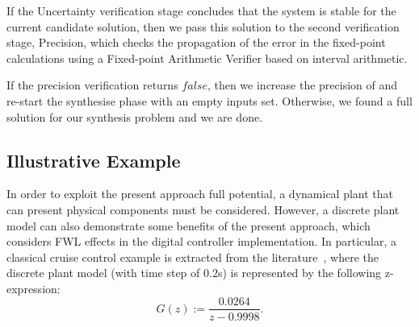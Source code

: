 \documentclass{sig-alternate-05-2015}
\begin{document}
If the {\sc Uncertainty} verification stage concludes that
the system is stable for the current candidate solution,
then we pass this solution to the second verification stage, {\sc Precision}, 
which checks the propagation of the error in the fixed-point 
calculations using a Fixed-point Arithmetic Verifier based on 
interval arithmetic. 
%
%

If the {\sc precision} verification returns $false$, then we 
increase the precision of  and re-start the {\sc synthesise} phase
with an empty {\sc inputs} set.
Otherwise, we found a full solution for our synthesis problem
and we are done.

\subsection{Illustrative Example} \label{sec:running-ex}

In order to exploit the present approach full potential, a dynamical plant that can
present physical components must be considered.  However, a discrete plant
model can also demonstrate some benefits of the present approach, which
considers FWL effects in the digital controller implementation.  In
particular, a classical cruise control example is extracted from the
literature~\cite{Astrom08}, where the discrete plant model (with time step
of $0.2$s) is represented by the following z-expression:
%
\begin{equation}
\label{Eq:running-example-plant}
G\left(z\right) := \frac{0.0264}{z-0.9998}.
\end{equation}
\end{document}
